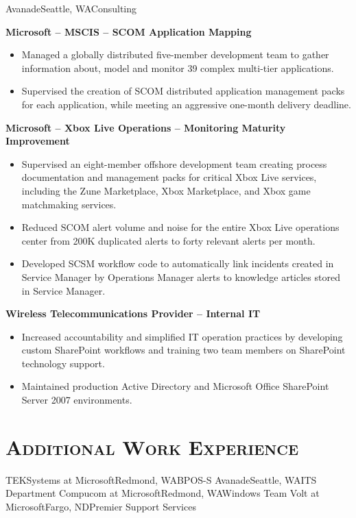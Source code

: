 \documentclass[11pt,letter,roman]{moderncv}
\begin{document}
{Avanade}{Seattle, WA}{Consulting}{%
  \textbf{Microsoft -- MSCIS -- SCOM Application Mapping}
  \begin{itemize}
    \item Managed a globally distributed five-member development team to
      gather information about, model and monitor 39 complex multi-tier
      applications.
    \item Supervised the creation of SCOM distributed application management
      packs for each application, while meeting an aggressive
      one-month delivery deadline.
  \end{itemize}
  \textbf{Microsoft -- Xbox Live Operations -- Monitoring Maturity Improvement}
  \begin{itemize}
    \item Supervised an eight-member offshore development team creating
      process documentation and management packs for critical Xbox Live
      services, including the Zune Marketplace, Xbox Marketplace, and Xbox
      game matchmaking services.
    \item Reduced SCOM alert volume and noise for the entire Xbox Live
      operations center from 200K duplicated alerts to forty relevant alerts
      per month.
    \item Developed SCSM workflow code to automatically link incidents created
      in Service Manager by Operations Manager alerts to knowledge articles
      stored in Service Manager.
  \end{itemize}
  \textbf{Wireless Telecommunications Provider -- Internal IT}
  \begin{itemize}
    \item Increased accountability and simplified IT operation practices by
      developing custom SharePoint workflows and training two team members
      on SharePoint technology support.
    \item Maintained production Active Directory and Microsoft Office
      SharePoint Server 2007 environments.
  \end{itemize}
}

\section{\textsc{Additional Work Experience}}
{TEKSystems at Microsoft}{Redmond, WA}{BPOS-S}{}
{Avanade}{Seattle, WA}{ITS Department}{}
{Compucom at Microsoft}{Redmond, WA}{Windows Team}{}
{Volt at Microsoft}{Fargo, ND}{Premier Support Services}{}
\end{document}
